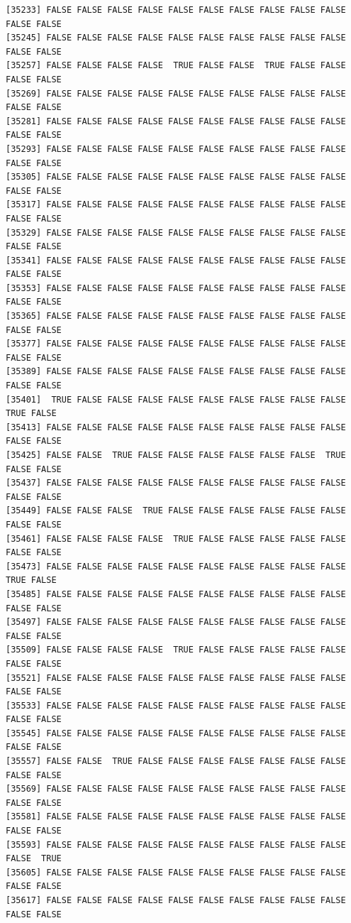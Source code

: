 \documentclass[
  a4paper,
  DIV=11,
  numbers=noendperiod]{scrartcl}
\begin{document}
\begin{verbatim}
[35233] FALSE FALSE FALSE FALSE FALSE FALSE FALSE FALSE FALSE FALSE FALSE FALSE
[35245] FALSE FALSE FALSE FALSE FALSE FALSE FALSE FALSE FALSE FALSE FALSE FALSE
[35257] FALSE FALSE FALSE FALSE  TRUE FALSE FALSE  TRUE FALSE FALSE FALSE FALSE
[35269] FALSE FALSE FALSE FALSE FALSE FALSE FALSE FALSE FALSE FALSE FALSE FALSE
[35281] FALSE FALSE FALSE FALSE FALSE FALSE FALSE FALSE FALSE FALSE FALSE FALSE
[35293] FALSE FALSE FALSE FALSE FALSE FALSE FALSE FALSE FALSE FALSE FALSE FALSE
[35305] FALSE FALSE FALSE FALSE FALSE FALSE FALSE FALSE FALSE FALSE FALSE FALSE
[35317] FALSE FALSE FALSE FALSE FALSE FALSE FALSE FALSE FALSE FALSE FALSE FALSE
[35329] FALSE FALSE FALSE FALSE FALSE FALSE FALSE FALSE FALSE FALSE FALSE FALSE
[35341] FALSE FALSE FALSE FALSE FALSE FALSE FALSE FALSE FALSE FALSE FALSE FALSE
[35353] FALSE FALSE FALSE FALSE FALSE FALSE FALSE FALSE FALSE FALSE FALSE FALSE
[35365] FALSE FALSE FALSE FALSE FALSE FALSE FALSE FALSE FALSE FALSE FALSE FALSE
[35377] FALSE FALSE FALSE FALSE FALSE FALSE FALSE FALSE FALSE FALSE FALSE FALSE
[35389] FALSE FALSE FALSE FALSE FALSE FALSE FALSE FALSE FALSE FALSE FALSE FALSE
[35401]  TRUE FALSE FALSE FALSE FALSE FALSE FALSE FALSE FALSE FALSE  TRUE FALSE
[35413] FALSE FALSE FALSE FALSE FALSE FALSE FALSE FALSE FALSE FALSE FALSE FALSE
[35425] FALSE FALSE  TRUE FALSE FALSE FALSE FALSE FALSE FALSE  TRUE FALSE FALSE
[35437] FALSE FALSE FALSE FALSE FALSE FALSE FALSE FALSE FALSE FALSE FALSE FALSE
[35449] FALSE FALSE FALSE  TRUE FALSE FALSE FALSE FALSE FALSE FALSE FALSE FALSE
[35461] FALSE FALSE FALSE FALSE  TRUE FALSE FALSE FALSE FALSE FALSE FALSE FALSE
[35473] FALSE FALSE FALSE FALSE FALSE FALSE FALSE FALSE FALSE FALSE  TRUE FALSE
[35485] FALSE FALSE FALSE FALSE FALSE FALSE FALSE FALSE FALSE FALSE FALSE FALSE
[35497] FALSE FALSE FALSE FALSE FALSE FALSE FALSE FALSE FALSE FALSE FALSE FALSE
[35509] FALSE FALSE FALSE FALSE  TRUE FALSE FALSE FALSE FALSE FALSE FALSE FALSE
[35521] FALSE FALSE FALSE FALSE FALSE FALSE FALSE FALSE FALSE FALSE FALSE FALSE
[35533] FALSE FALSE FALSE FALSE FALSE FALSE FALSE FALSE FALSE FALSE FALSE FALSE
[35545] FALSE FALSE FALSE FALSE FALSE FALSE FALSE FALSE FALSE FALSE FALSE FALSE
[35557] FALSE FALSE  TRUE FALSE FALSE FALSE FALSE FALSE FALSE FALSE FALSE FALSE
[35569] FALSE FALSE FALSE FALSE FALSE FALSE FALSE FALSE FALSE FALSE FALSE FALSE
[35581] FALSE FALSE FALSE FALSE FALSE FALSE FALSE FALSE FALSE FALSE FALSE FALSE
[35593] FALSE FALSE FALSE FALSE FALSE FALSE FALSE FALSE FALSE FALSE FALSE  TRUE
[35605] FALSE FALSE FALSE FALSE FALSE FALSE FALSE FALSE FALSE FALSE FALSE FALSE
[35617] FALSE FALSE FALSE FALSE FALSE FALSE FALSE FALSE FALSE FALSE FALSE FALSE

\end{verbatim}
\end{document}
